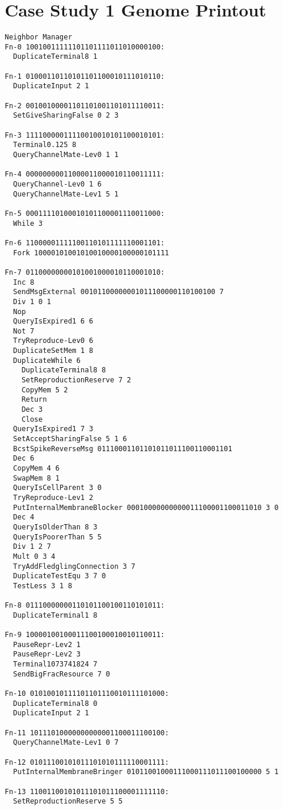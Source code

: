 \section{Case Study 1 Genome Printout}

\begin{verbatim}
Neighbor Manager
Fn-0 10010011111101101111011010000100:
  DuplicateTerminal8 1

Fn-1 01000110110101101100010111010110:
  DuplicateInput 2 1

Fn-2 00100100001101101001101011110011:
  SetGiveSharingFalse 0 2 3

Fn-3 11110000011110010010101100010101:
  Terminal0.125 8
  QueryChannelMate-Lev0 1 1

Fn-4 00000000011000011000010110011111:
  QueryChannel-Lev0 1 6
  QueryChannelMate-Lev1 5 1

Fn-5 00011110100010101100001110011000:
  While 3

Fn-6 11000001111100110101111110001101:
  Fork 10000101001010010000100000101111

Fn-7 01100000000101001000010110001010:
  Inc 8
  SendMsgExternal 00101100000001011100000110100100 7
  Div 1 0 1
  Nop
  QueryIsExpired1 6 6
  Not 7
  TryReproduce-Lev0 6
  DuplicateSetMem 1 8
  DuplicateWhile 6
    DuplicateTerminal8 8
    SetReproductionReserve 7 2
    CopyMem 5 2
    Return
    Dec 3
    Close
  QueryIsExpired1 7 3
  SetAcceptSharingFalse 5 1 6
  BcstSpikeReverseMsg 01110001101101011011100110001101
  Dec 6
  CopyMem 4 6
  SwapMem 8 1
  QueryIsCellParent 3 0
  TryReproduce-Lev1 2
  PutInternalMembraneBlocker 00010000000000011100001100011010 3 0
  Dec 4
  QueryIsOlderThan 8 3
  QueryIsPoorerThan 5 5
  Div 1 2 7
  Mult 0 3 4
  TryAddFledglingConnection 3 7
  DuplicateTestEqu 3 7 0
  TestLess 3 1 8

Fn-8 01110000000110101100100110101011:
  DuplicateTerminal1 8

Fn-9 10000100100011100100010010110011:
  PauseRepr-Lev2 1
  PauseRepr-Lev2 3
  Terminal1073741824 7
  SendBigFracResource 7 0

Fn-10 01010010111101101110010111101000:
  DuplicateTerminal8 0
  DuplicateInput 2 1

Fn-11 10111010000000000001100011100100:
  QueryChannelMate-Lev1 0 7

Fn-12 01011100101011101010111110001111:
  PutInternalMembraneBringer 01011001000111000111011100100000 5 1

Fn-13 11001100101011101011100001111110:
  SetReproductionReserve 5 5


\end{verbatim}
